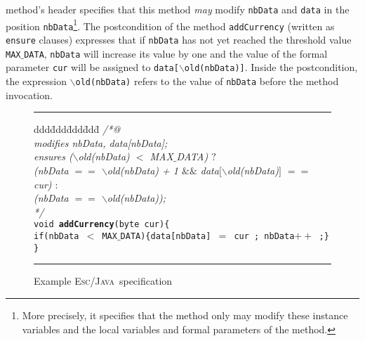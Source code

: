 \documentclass[a4paper]{llncs}
\newcommand{\escj}{\textsc{Esc/Java}}
\begin{document}
method's header specifies that 
this method \emph{may} modify \texttt{nbData} and 
\texttt{data} in the position \texttt{nbData}\footnote{More precisely,
it specifies that the method only may modify these instance variables
and the local variables and formal parameters of the method.}. The
postcondition of the method \texttt{addCurrency} (written as 
\texttt{ensure} clauses) expresses that if \texttt{nbData} has not 
yet reached the threshold value \texttt{MAX$\_$DATA}, \texttt{nbData} 
will increase its value by one and the value of the formal parameter 
\texttt{cur} will be assigned to \texttt{data[\(\backslash\)old(nbData)]}.  
Inside the postcondition, the expression 
\texttt{$\backslash$old(nbData)} refers to the value of 
\texttt{nbData} before the method invocation. 
\begin{figure}[htb]
\rule{\linewidth}{0.25mm}
\begin{tabbing}
ddd\=ddd\=ddd\=ddd\= \kill 
\textsl{/*@} \\
\>\textsl{modifies nbData, data[nbData];}  \\
\>\textsl{ensures ($\backslash$old(nbData) $<$ MAX$\_$DATA) $?$}  \\
\>\>\>\textsl{(nbData $==$ $\backslash$old(nbData) + 1 $\&\&$ data$[\backslash$old(nbData)$]$ $==$ cur) $:$}  \\
\>\>\>\textsl{(nbData $==$ $\backslash$old(nbData));}  \\
\textsl{*/} \\
\texttt{void {\bf addCurrency}(byte cur)\{ } \\
\>\texttt{if(nbData $<$ MAX$\_$DATA)\{data[nbData] $=$ cur ; nbData$++$ ;\}}  \\
\texttt{\}}
\end{tabbing}
\caption{Example \escj~specification} 
\label{fig-add-cur} 
\rule{\linewidth}{0.25mm} 
\end{figure} 
\end{document}
